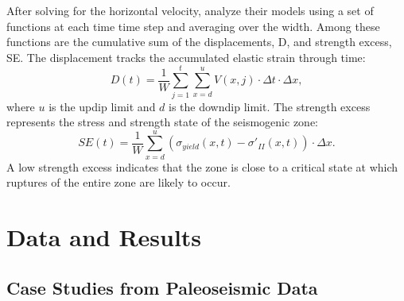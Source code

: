 \documentclass[]{proposalnsf}
\begin{document}
After solving for the horizontal velocity, \citet{Herrendorfer2015} analyze their models using a set of functions at each time time step and averaging over the width. Among these functions are the cumulative sum of the displacements, D, and strength excess, SE. The displacement tracks the accumulated elastic strain through time:
%
\begin{equation}
D(t) = \frac{1}{W} \sum_{j=1}^t \sum_{x=d}^u V(x,j)\cdot \Delta t \cdot \Delta x,	
\end{equation}
where $u$ is the updip limit and $d$ is the downdip limit. The strength excess represents the stress and strength state of the seismogenic zone:
\begin{equation}
	SE(t) = \frac{1}{W}\sum_{x=d}^u (\sigma_{yield}(x,t) - \sigma '_{II}(x,t)) \cdot \Delta x.
\end{equation}
 A low strength excess indicates that the zone is close to a critical state at which ruptures of the entire zone are likely to occur.

\section{Data and Results}

\subsection{Case Studies from Paleoseismic Data}
\end{document}
